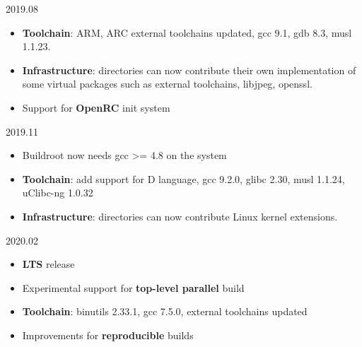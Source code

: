 \begin{frame}{2019.08}
  \begin{itemize}
  \item {\bf Toolchain}: ARM, ARC external toolchains updated, gcc
    9.1, gdb 8.3, musl 1.1.23.
  \item {\bf Infrastructure}:  directories can now
    contribute their own implementation of some virtual packages such
    as external toolchains, libjpeg, openssl.
  \item Support for {\bf OpenRC} init system
  \end{itemize}
\end{frame}

\begin{frame}{2019.11}
  \begin{itemize}
  \item Buildroot now needs gcc >= 4.8 on the system
  \item {\bf Toolchain}: add support for D language, gcc 9.2.0, glibc
    2.30, musl 1.1.24, uClibc-ng 1.0.32
  \item {\bf Infrastructure}:  directories can now
    contribute Linux kernel extensions.
  \end{itemize}
\end{frame}

\begin{frame}{2020.02}
  \begin{itemize}
  \item {\bf LTS} release
  \item Experimental support for {\bf top-level parallel} build
  \item {\bf Toolchain}: binutils 2.33.1, gcc 7.5.0, external
    toolchains updated
  \item Improvements for {\bf reproducible} builds
  \end{itemize}
\end{frame}
